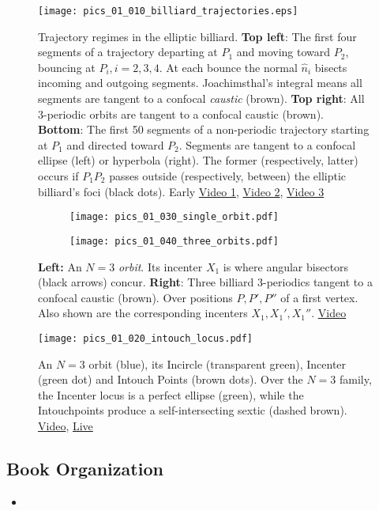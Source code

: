 
\begin{figure}
\centering
\texttt{[image: pics\_01\_010\_billiard\_trajectories.eps]}
\caption{Trajectory regimes in the elliptic billiard. \textbf{Top left}: The first four segments of a trajectory departing at $P_1$ and moving toward $P_2$, bouncing at $P_i, i=2,3,4$. At each bounce the normal $\hat{n}_i$ bisects incoming and outgoing segments. Joachimsthal's integral \cite{sergei91} means all segments are tangent to a confocal {\em caustic} (brown). \textbf{Top right}: All 3-periodic orbits are tangent to a confocal caustic (brown). \textbf{Bottom}: The first 50 segments of a non-periodic trajectory starting at $P_1$ and directed toward $P_2$. Segments are tangent to a confocal ellipse (left) or hyperbola (right). The former (respectively, latter) occurs if $P_1P_2$ passes outside (respectively, between) the elliptic billiard's foci (black dots). Early \href{https://youtu.be/A7mPzrNJHkA}{Video 1}, \href{https://youtu.be/9zAr5-nm7mw}{Video 2}, \href{https://youtu.be/6yXA0dyWhFY}{Video 3}}
\label{fig:01-billiard-trajectories}
\end{figure}

\begin{figure}
\centering
\begin{subfigure}[t]{0.45\textwidth}
 \centering
 \texttt{[image: pics\_01\_030\_single\_orbit.pdf]}
\end{subfigure}
\hfill
\begin{subfigure}[t]{0.45\textwidth}
 \centering
  \texttt{[image: pics\_01\_040\_three\_orbits.pdf]}
\end{subfigure}
     \caption{\textbf{Left:} An $N=3$ {\em orbit}. Its incenter $X_1$ is where angular bisectors (black arrows) concur. \textbf{Right}: Three billiard 3-periodics tangent to a confocal caustic (brown). Over positions $P,P',P''$ of a first vertex. Also shown are the corresponding incenters $X_1,X_1',X_1''$.  
\href{https://youtu.be/Y3q35DObfZU}{Video} }
\label{01-basic-n3}
\end{figure}


\begin{figure}
\centering
\texttt{[image: pics\_01\_020\_intouch\_locus.pdf]}
\caption{An $N=3$ orbit (blue), its Incircle (transparent green), Incenter (green dot) and Intouch Points (brown dots). Over the $N=3$ family, the Incenter locus is a perfect ellipse (green), while the Intouchpoints produce a self-intersecting sextic (dashed brown).
\href{https://youtu.be/9xU6T7hQMzs}{Video}, \href{https://bit.ly/3io8lgN}{Live}}
\label{fig:01-intouch-locus}
\end{figure}

\subsection*{Book Organization}

\begin{itemize}
    \item 
\end{itemize}



